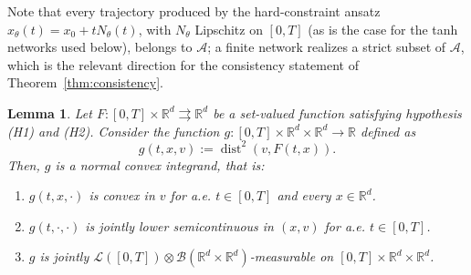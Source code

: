 \documentclass[11pt]{elsarticle}
\newtheorem{lemma}[theorem]{Lemma}
\theoremstyle{definition}
\theoremstyle{remark}
\numberwithin{equation}{section}
\begin{document}
	Note that every trajectory produced by the hard-constraint ansatz
	$x_\theta(t)=x_0+tN_\theta(t)$, with $N_\theta$ Lipschitz on $[0,T]$
	(as is the case for the tanh networks used below), belongs to
	$\mathcal{A}$; a finite network realizes a strict subset of
	$\mathcal{A}$, which is the relevant direction for the consistency
	statement of Theorem~\ref{thm:consistency}.
	
	\begin{lemma}\label{lem:normal-integrand}
		Let $F:[0,T]\times\mathbb{R}^d\rightrightarrows\mathbb{R}^d$ be a set-valued function satisfying hypothesis \textup{(H1)} and \textup{(H2)}.
		Consider the function $g:[0,T]\times \mathbb{R}^d \times \mathbb{R}^d \to \mathbb{R}$ defined as
		\[
		g(t, x, v) := \operatorname{dist}^2(v, F(t, x)).
		\]
		Then, $g$ is a normal convex integrand, that is:
		\begin{enumerate}
			\item $g(t, x, \cdot)$ is convex in $v$ for a.e. $t \in [0,T]$ and every $x\in\mathbb{R}^d$.
			\item $g(t, \cdot, \cdot)$ is jointly lower semicontinuous in $(x, v)$ for a.e. $t \in [0,T]$.
			\item $g$ is jointly
			$\mathcal{L}([0,T])\otimes\mathcal{B}(\mathbb{R}^d\times\mathbb{R}^d)$-measurable
			on $[0,T]\times\mathbb{R}^d\times\mathbb{R}^d$.
		\end{enumerate}
	\end{lemma}
\end{document}
